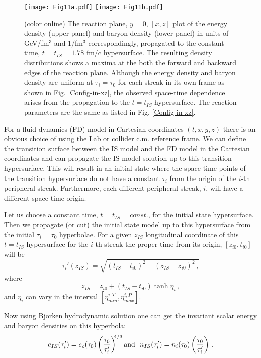 \documentclass[aps,prc,twocolumn,floatfix,showpacs,a4paper,
nofootinbib,amsmath,amssymb]{revtex4-1}
\newcommand{\be}{\begin{equation}}
\newcommand{\ee}{\end{equation}}
\begin{document}
\begin{figure}[htb]     %
\begin{center}
\resizebox{1.01\columnwidth}{!}
{\texttt{[image: Fig11a.pdf]}}
\resizebox{1.01\columnwidth}{!}
{\texttt{[image: Fig11b.pdf]}}
\caption{ (color online)
The reaction plane, $y=0$, $[x,z]$  plot of the energy density 
(upper panel) and baryon density (lower panel) in 
units of GeV/fm$^3$ and 1/fm$^3$ correspondingly,
propagated to the constant time, $t=t_{IS} = 1.78$ fm/c 
hypersurface. The resulting density distributions shows a maxima at the both the forward and backward edges of the
reaction plane.
Although the energy density and baryon density are uniform
at $\tau_i = \tau_0$ for each streak in its own frame as shown in
Fig. \ref{Config-in-xz}, the observed space-time dependence arises from 
the propagation to the $t=t_{IS}$ hypersurface.
The reaction parameters are the same as 
listed in Fig. \ref{Config-in-xz}.
}
\label{e-XZ}
\end{center}
\end{figure}        %
%


 For a fluid dynamics (FD) model in Cartesian coordinates $(t, x, y, z)$ 
there is an obvious choice of using the Lab or collider c.m. reference frame.   We can define the transition surface between the IS model and the FD
model in the Cartesian coordinates and can propagate the IS model 
solution up to this transition hypersurface. This will result in an
initial state where the space-time points of the transition hypersurface
do not have a constant $\tau_i$ from the origin of the $i$-th peripheral
streak. Furthermore, each different peripheral streak, $i$, will have a
different space-time origin.


Let us choose a constant time, $t=t_{IS}=const.$, for the 
initial state hypersurface. Then we propagate (or cut) the
initial state model up to this hypersurface from the initial $\tau_i=\tau_0$
hyperbolae. For a given $z_{IS}$ longitudinal coordinate of this 
$t=t_{IS}$ hypersurface for the $i$-th streak the proper time
from its origin, $[z_{i0}, t_{i0}]$ will be 
\be
\tau_i '(z_{IS}) = \sqrt{(t_{IS}- t_{i0})^2 - (z_{IS}- z_{i0})^2\,,}
\label{tau_prime}
\ee
where
\be
z_{IS} = z_{i0} + (t_{IS} - t_{i0}) \tanh  \eta_i \,,
\ee
and $\eta_i$ can vary in the interval $[\eta_{min}^{i,T},\eta_{max}^{i,P}]$.

Now using  Bjorken hydrodynamic solution one can get 
the invariant scalar energy and baryon densities on this
hyperbola:
\be
e_{IS}(\tau_i ') = e_c(\tau_0) \left( \frac{\tau_0} {\tau_i '}\right)^{\!\!4/3}
{\rm and} \ \
n_{IS}(\tau_i ') = n_i(\tau_0) \left( \frac{\tau_0} {\tau_i '}\right)\,.
\label{bj_sol_prime}
\ee
\end{document}
